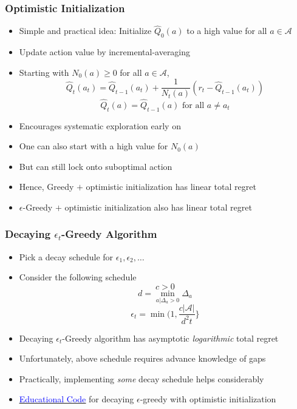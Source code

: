 \documentclass[handout]{beamer}
\begin{document}
\begin{frame}
\frametitle{Optimistic Initialization}
\pause
\begin{itemize}[<+->]
\item Simple and practical idea: Initialize $\hat{Q}_0(a)$ to a high value for all $a\in \mathcal{A}$
\item Update action value by incremental-averaging
\item Starting with $N_0(a) \geq 0$ for all $a\in \mathcal{A}$,
$$\hat{Q}_t(a_t) = \hat{Q}_{t-1}(a_t) + \frac 1 {N_t(a)} (r_t - \hat{Q}_{t-1}(a_t))$$
$$\hat{Q}_t(a) = \hat{Q}_{t-1}(a) \mbox{ for all } a \neq a_t$$
\item Encourages systematic exploration early on
\item One can also start with a high value for $N_0(a)$ 
\item But can still lock onto suboptimal action
\item Hence, Greedy $+$ optimistic initialization has linear total regret
\item $\epsilon$-Greedy $+$ optimistic initialization also has linear total regret
\end{itemize}
\end{frame}

\begin{frame}
\frametitle{Decaying $\epsilon_t$-Greedy Algorithm}
\pause
\begin{itemize}[<+->]
\item Pick a decay schedule for $\epsilon_1, \epsilon_2, \ldots$
\item Consider the following schedule
$$c > 0$$
$$d = \min_{a|\Delta_a > 0} \Delta_a$$
$$\epsilon_t = \min(1, \frac {c|\mathcal{A}|} {d^2t}\}$$
\item Decaying $\epsilon_t$-Greedy algorithm has asymptotic {\em logarithmic} total regret
\item Unfortunately, above schedule requires advance knowledge of gaps
\item Practically, implementing {\em some} decay schedule helps considerably
\item \href{https://github.com/coverdrive/MDP-DP-RL/blob/master/src/algorithms/mab/epsilon_greedy.py}{\underline{\textcolor{blue}{Educational Code}}} for decaying $\epsilon$-greedy with optimistic initialization
\end{itemize}
\end{frame}
\end{document}
